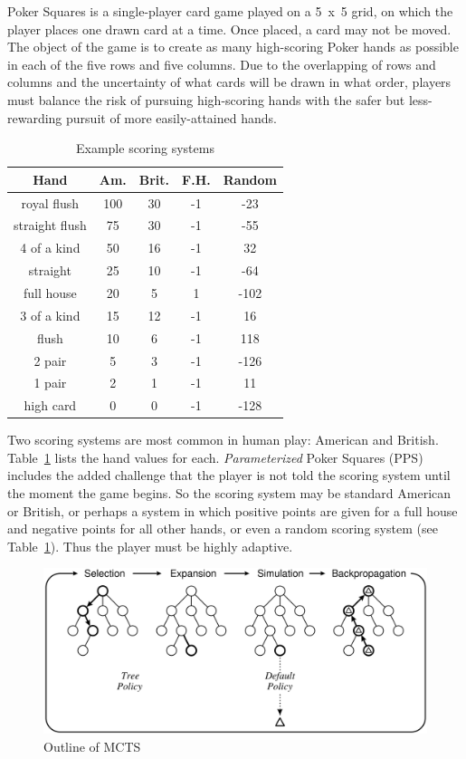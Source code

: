 \documentclass[letterpaper]{article}
\begin{document}
Poker Squares is a single-player card game played on a 5~x~5 grid, on which the player places one drawn card at a time. Once placed, a card may not be moved. The object of the game is to create as many high-scoring Poker hands as possible in each of the five rows and five columns. Due to the overlapping of rows and columns and the uncertainty of what cards will be drawn in what order, players must balance the risk of pursuing high-scoring hands with the safer but less-rewarding pursuit of more easily-attained hands.

\begin{table}%
\caption{Example scoring systems}
\label{tbl:scoring}
\centering
\begin{tabular}{c c c c c}
\hline
Hand & Am. & Brit. & F.H. & Random \\
\hline
royal flush     & 100 & 30 & -1 & -23 \\
straight flush & 75 & 30 & -1 & -55 \\
4 of a kind    & 50 & 16 & -1 & 32 \\
straight        & 25 & 10 & -1 & -64 \\
full house     & 20 & 5  & 1 & -102 \\
3 of a kind   & 15 & 12 & -1 & 16 \\
flush           & 10 & 6   & -1 & 118 \\
2 pair         & 5   & 3   & -1 & -126 \\
1 pair         & 2   & 1   & -1 & 11 \\
high card    & 0   & 0   & -1 & -128 \\
\hline
\end{tabular}
\end{table}

Two scoring systems are most common in human play: American and British. Table~\ref{tbl:scoring} lists the hand values for each. {\it Parameterized} Poker Squares (PPS) includes the added challenge that the player is not told the scoring system until the moment the game begins. So the scoring system may be standard American or British, or perhaps a system in which positive points are given for a full house and negative points for all other hands, or even a random scoring system (see Table~\ref{tbl:scoring}). Thus the player must be highly adaptive.

\begin{figure}[b]
\begin{center}
\includegraphics[width=.95\linewidth]{images/oneiteration.png}
\end{center}
\caption{Outline of MCTS~\cite{browne2012survey} }
\label{fig:OneIter}
\end{figure}
\end{document}
